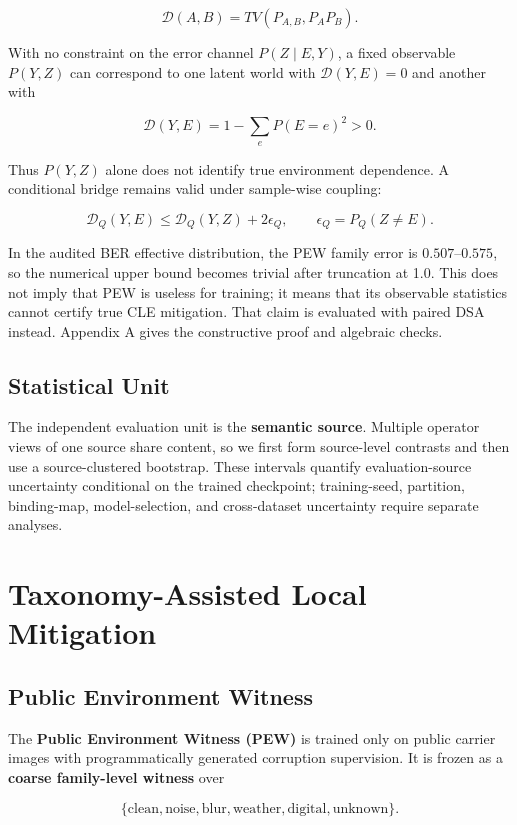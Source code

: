 \[
\mathcal D(A,B)=TV(P_{A,B},P_AP_B).
\]

With no constraint on the error channel \(P(Z\mid E,Y)\), a fixed observable \(P(Y,Z)\) can correspond to one latent world with \(\mathcal D(Y,E)=0\) and another with

\[
\mathcal D(Y,E)=1-\sum_eP(E=e)^2>0.
\]

Thus \(P(Y,Z)\) alone does not identify true environment dependence. A conditional bridge remains valid under sample-wise coupling:

\[
\mathcal D_Q(Y,E)\le
\mathcal D_Q(Y,Z)+2\epsilon_Q,
\qquad
\epsilon_Q=P_Q(Z\neq E).
\]

In the audited BER effective distribution, the PEW family error is \(0.507\)--\(0.575\), so the numerical upper bound becomes trivial after truncation at 1.0. This does not imply that PEW is useless for training; it means that its observable statistics cannot certify true CLE mitigation. That claim is evaluated with paired DSA instead. Appendix A gives the constructive proof and algebraic checks.

\subsection{Statistical Unit}

The independent evaluation unit is the \textbf{semantic source}. Multiple operator views of one source share content, so we first form source-level contrasts and then use a source-clustered bootstrap. These intervals quantify evaluation-source uncertainty conditional on the trained checkpoint; training-seed, partition, binding-map, model-selection, and cross-dataset uncertainty require separate analyses.

\section{Taxonomy-Assisted Local Mitigation}

\subsection{Public Environment Witness}

The \textbf{Public Environment Witness (PEW)} is trained only on public carrier images with programmatically generated corruption supervision. It is frozen as a \textbf{coarse family-level witness} over

\[
\{\text{clean},\text{noise},\text{blur},\text{weather},\text{digital},\text{unknown}\}.
\]

